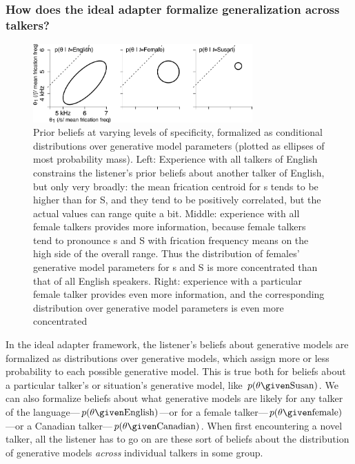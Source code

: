 \subsubsection{How does the ideal adapter formalize generalization across talkers?}
\label{sec:how-ideal-adapter-gen}

\begin{figure}[htb]
  \centering
\includegraphics[width=0.75\textwidth]{part2-schematics/english-male-talker-annotated.pdf}
  \caption{Prior beliefs at varying levels of specificity, formalized as conditional distributions over generative model parameters (plotted as ellipses of most probability mass).  Left: Experience with all talkers of English constrains the listener's prior beliefs about another talker of English, but only very broadly: the mean frication centroid for \ph s tends to be higher than for \ph S, and they tend to be positively correlated, but the actual values can range quite a bit. Middle: experience with all female talkers provides more information, because female talkers tend to pronounce \ph s and \ph S with frication frequency means on the high side of the overall range. Thus the distribution of females' generative model parameters for \ph s and \ph S is more concentrated than that of all English speakers. Right: experience with a particular female talker provides even more information, and the corresponding distribution over generative model parameters is even more concentrated}
  \label{fig:prior-beliefs-different-scales}
\end{figure}

In the ideal adapter framework, the listener's beliefs about generative models are formalized as distributions over generative models, which assign more or less probability to each possible generative model.  This is true both for beliefs about a particular talker's or situation's generative model, like $p(\theta \given \mathrm{Susan})$. We can also formalize beliefs about what generative models are likely for any talker of the language---$p(\theta \given \mathrm{English})$---or for a female talker---$p(\theta \given \mathrm{female})$---or a Canadian talker---$p(\theta \given \mathrm{Canadian})$.  When first encountering a novel talker, all the listener has to go on are these sort of beliefs about the distribution of generative models \emph{across} individual talkers in some group.  

